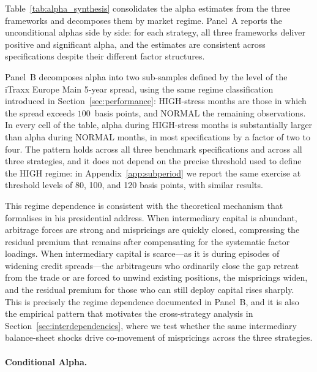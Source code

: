 Table~\ref{tab:alpha_synthesis} consolidates the alpha estimates from
the three frameworks and decomposes them by market regime. Panel~A
reports the unconditional alphas side by side: for each strategy, all
three frameworks deliver positive and significant alpha, and the
estimates are consistent across specifications despite their different
factor structures.

Panel~B decomposes alpha into two sub-samples defined by the level of
the iTraxx Europe Main 5-year spread, using the same regime
classification introduced in Section~\ref{sec:performance}: HIGH-stress
months are those in which the spread exceeds $100$~basis points, and
NORMAL the remaining observations. In every cell of the table, alpha during HIGH-stress
months is substantially larger than alpha during NORMAL months, in most specifications by a factor of two
to four. The pattern holds across all three benchmark
specifications and across all three strategies, and it does not depend on
the precise threshold used to define the HIGH regime: in
Appendix~\ref{app:subperiod} we report the same exercise at threshold
levels of 80, 100, and 120 basis points, with similar results.

This regime dependence is consistent with the theoretical mechanism that
\citet{duffie2010presidential} formalises in his presidential address.
When intermediary capital is abundant, arbitrage forces are strong and
mispricings are quickly closed, compressing the residual premium that
remains after compensating for the systematic factor loadings. When
intermediary capital is scarce---as it is during episodes of widening
credit spreads---the arbitrageurs who ordinarily close the gap retreat
from the trade or are forced to unwind existing positions, the
mispricings widen, and the residual premium for those who can still
deploy capital rises sharply. This is precisely the regime dependence
documented in Panel~B, and it is also the empirical pattern that
motivates the cross-strategy analysis in
Section~\ref{sec:interdependencies}, where we test whether the same
intermediary balance-sheet shocks drive co-movement of mispricings across
the three strategies.

\paragraph{Conditional Alpha.}

